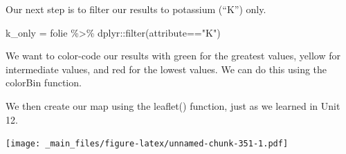 \documentclass[
]{book}
\newenvironment{Shaded}{\begin{snugshade}}{\end{snugshade}}
\newcommand{\AttributeTok}[1]{\textcolor[rgb]{0.77,0.63,0.00}{#1}}
\newcommand{\DecValTok}[1]{\textcolor[rgb]{0.00,0.00,0.81}{#1}}
\newcommand{\FloatTok}[1]{\textcolor[rgb]{0.00,0.00,0.81}{#1}}
\newcommand{\FunctionTok}[1]{\textcolor[rgb]{0.00,0.00,0.00}{#1}}
\newcommand{\NormalTok}[1]{#1}
\newcommand{\OtherTok}[1]{\textcolor[rgb]{0.56,0.35,0.01}{#1}}
\newcommand{\SpecialCharTok}[1]{\textcolor[rgb]{0.00,0.00,0.00}{#1}}
\newcommand{\StringTok}[1]{\textcolor[rgb]{0.31,0.60,0.02}{#1}}
\begin{document}
Our next step is to filter our results to potassium (``K'') only.

\begin{Shaded}
\begin{Highlighting}[]
\NormalTok{k\_only }\OtherTok{=}\NormalTok{ folie }\SpecialCharTok{\%\textgreater{}\%}
\NormalTok{  dplyr}\SpecialCharTok{::}\FunctionTok{filter}\NormalTok{(attribute}\SpecialCharTok{==}\StringTok{"K"}\NormalTok{)}
\end{Highlighting}
\end{Shaded}

We want to color-code our results with green for the greatest values, yellow for intermediate values, and red for the lowest values. We can do this using the colorBin function.

\begin{Shaded}
\end{Shaded}

We then create our map using the leaflet() function, just as we learned in Unit 12.

\begin{Shaded}
\end{Shaded}

\texttt{[image: \_main\_files/figure-latex/unnamed-chunk-351-1.pdf]}
\end{document}
